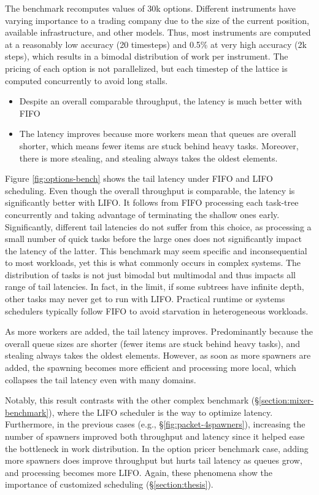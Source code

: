 \documentclass[12pt,a4paper,twoside]{report}
\begin{document}
The benchmark recomputes values of 30k options. Different instruments have varying importance to a trading company due to the size of the current position, available infrastructure, and other models. Thus, most instruments are computed at a reasonably low accuracy (20 timesteps) and 0.5\% at very high accuracy (2k steps), which results in a bimodal distribution of work per instrument. The pricing of each option is not parallelized, but each timestep of the lattice is computed concurrently to avoid long stalls. 

\begin{itemize}
    \item Despite an overall comparable throughput, the latency is much better with FIFO
    \item The latency improves because more workers mean that queues are overall shorter, which means fewer items are stuck behind heavy tasks. Moreover, there is more stealing, and stealing always takes the oldest elements. 
\end{itemize}

Figure \ref{fig:options-bench} shows the tail latency under FIFO and LIFO scheduling. Even though the overall throughput is comparable, the latency is significantly better with LIFO. It follows from FIFO processing each task-tree concurrently and taking advantage of terminating the shallow ones early. Significantly, different tail latencies do not suffer from this choice, as processing a small number of quick tasks before the large ones does not significantly impact the latency of the latter. This benchmark may seem specific and inconsequential to most workloads, yet this is what commonly occurs in complex systems. The distribution of tasks is not just bimodal but multimodal and thus impacts all range of tail latencies. In fact, in the limit, if some subtrees have infinite depth, other tasks may never get to run with LIFO. Practical runtime or systems schedulers typically follow FIFO to avoid starvation in heterogeneous workloads.   

As more workers are added, the tail latency improves. Predominantly because the overall queue sizes are shorter (fewer items are stuck behind heavy tasks), and stealing always takes the oldest elements. However, as soon as more spawners are added, the spawning becomes more efficient and processing more local, which collapses the tail latency even with many domains. 

Notably, this result contrasts with the other complex benchmark (\S\ref{section:mixer-benchmark}), where the LIFO scheduler is the way to optimize latency. Furthermore, in the previous cases (e.g., \S\ref{fig:packet-4spawners}), increasing the number of spawners improved both throughput and latency since it helped ease the bottleneck in work distribution. In the option pricer benchmark case, adding more spawners does improve throughput but hurts tail latency as queues grow, and processing becomes more LIFO. Again, these phenomena show the importance of customized scheduling (\S\ref{section:thesis}).
\end{document}
